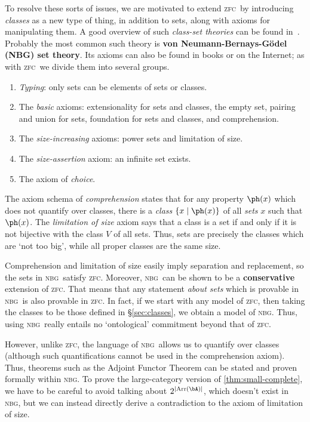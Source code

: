 \documentclass[12pt]{amsart}
\def\zfc{\textsc{zfc}}
\def\nbg{\textsc{nbg}}
\begin{document}
To resolve these sorts of issues, we are motivated to extend \zfc\ by
introducing \emph{classes} as a new type of thing, in addition to
sets, along with axioms for manipulating them.  A good overview of
such \emph{class-set theories} can be found in~\cite{levy:classes}.
Probably the most common such theory is \textbf{von
  Neumann-Bernays-G\"odel (NBG) set theory}.  Its axioms can also be
found in books or on the Internet; as with \zfc\ we divide them into
several groups.
\begin{enumerate}
\item \emph{Typing}: only sets can be elements of sets or classes.
\item The \emph{basic} axioms: extensionality for sets and classes,
  the empty set, pairing and union for sets, foundation for sets and
  classes, and comprehension.
\item The \emph{size-increasing} axioms: power sets and limitation of
  size.
\item The \emph{size-assertion} axiom: an infinite set exists.
\item The axiom of \emph{choice}.
\end{enumerate}
The axiom schema of \emph{comprehension} states that for any property
$\ph(x)$ which does not quantify over classes, there is a \emph{class}
$\{x \mid \ph(x)\}$ of all \emph{sets} $x$ such that $\ph(x)$.  The
\emph{limitation of size} axiom says that a class is a set if and only
if it is not bijective with the class $V$ of all sets.  Thus, sets are
precisely the classes which are `not too big', while all proper
classes are the same size.

Comprehension and limitation of size easily imply separation and
replacement, so the sets in \nbg\ satisfy \zfc.  Moreover, \nbg\ can
be shown to be a \textbf{conservative} extension of \zfc.  That means
that any statement \emph{about sets} which is provable in \nbg\ is
also provable in \zfc.  In fact, if we start with any model of \zfc,
then taking the classes to be those defined in \S\ref{sec:classes}, we
obtain a model of \nbg.  Thus, using \nbg\ really entails no
`ontological' commitment beyond that of \zfc.

However, unlike \zfc, the language of \nbg\ allows us to quantify over
classes (although such quantifications cannot be used in the
comprehension axiom).  Thus, theorems such as the Adjoint Functor
Theorem can be stated and proven formally within \nbg.  To prove the
large-category version of \autoref{thm:small-complete}, we have to be
careful to avoid talking about $2^{|\mathrm{Arr}(\bA)|}$, which
doesn't exist in \nbg, but we can instead directly derive a
contradiction to the axiom of limitation of size.
\end{document}

